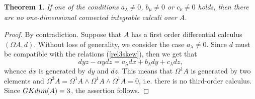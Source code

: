 \documentclass[10pt,a4paper]{amsart}
\newtheorem{theorem}{Theorem}
\begin{document}
\begin{theorem}\label{Secondtheoremsmoothness3-dimensionalalgebras}
If one of the conditions $a_{\lambda}\not = 0$, $b_{\mu}\not=0$ or $c_{\nu}\not=0$ holds, then there are no one-dimensional connected integrable calculi over $A$.
\end{theorem}

\begin{proof}
By contradiction. Suppose that $A$ has a first order differential calculus $(\Omega A, d)$. Without loss of generality, we consider the case $a_{\lambda}\not =0$. Since $d$ must be compatible with the relations {\rm (}\ref{rel3skew}{\rm )}, then we get that
\begin{equation*}
    dy z-\alpha ydz = a_{\lambda}dx +b_{\lambda}dy + c_{\lambda}dz,
\end{equation*}
whence $dx$ is generated by $dy$ and $dz$. This means that $\Omega^1A$ is generated by two elements and $\Omega^3A=\Omega^1A\wedge\Omega^1A\wedge\Omega^1A=0$, i.e. there is no third-order calculus. Since ${\rm GKdim}(A) = 3$, the assertion follows.
\end{proof}
\end{document}
